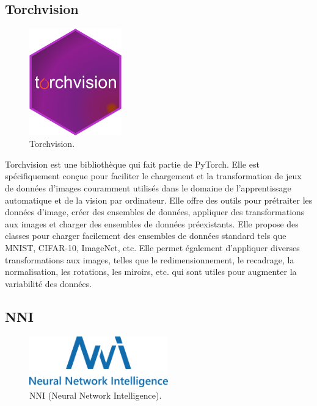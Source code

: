 \subsection{Torchvision}

\begin{figure}[hbt!]
  \centering
  \includegraphics[width=4cm]{images_pfe/torchvision.png}
  \caption{Torchvision.}
  \label{fig:torchvision}
\end{figure}
\FloatBarrier
\medskip

Torchvision est une bibliothèque qui fait partie de PyTorch. Elle est spécifiquement conçue pour faciliter le chargement et la transformation de jeux de données d'images couramment utilisés dans le domaine de l'apprentissage automatique et de la vision par ordinateur. Elle offre des outils pour prétraiter les données d'image, créer des ensembles de données, appliquer des transformations aux images et charger des ensembles de données préexistants. Elle propose des classes pour charger facilement des ensembles de données standard tels que MNIST, CIFAR-10, ImageNet, etc. Elle permet également d'appliquer diverses transformations aux images, telles que le redimensionnement, le recadrage, la normalisation, les rotations, les miroirs, etc. qui sont utiles pour augmenter la variabilité des données.

\subsection{NNI}

\begin{figure}[hbt!]
  \centering
  \includegraphics[width=6cm]{images_pfe/nni.png}
  \caption{NNI (Neural Network Intelligence).}
  \label{fig:nni}
\end{figure}
\FloatBarrier
\medskip

